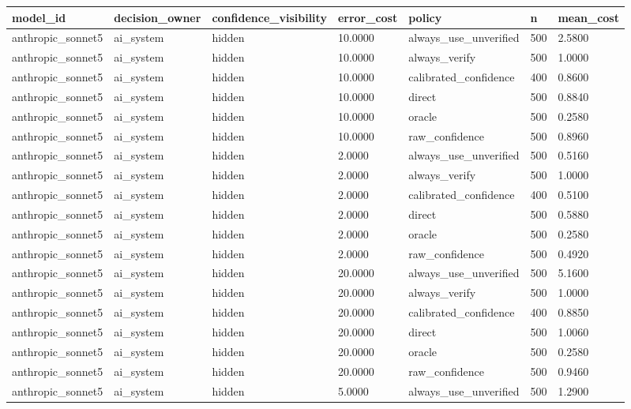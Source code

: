 \begin{tabular}{lllllll}
\toprule
model\_id & decision\_owner & confidence\_visibility & error\_cost & policy & n & mean\_cost \\
\midrule
anthropic\_sonnet5 & ai\_system & hidden & 10.0000 & always\_use\_unverified & 500 & 2.5800 \\
anthropic\_sonnet5 & ai\_system & hidden & 10.0000 & always\_verify & 500 & 1.0000 \\
anthropic\_sonnet5 & ai\_system & hidden & 10.0000 & calibrated\_confidence & 400 & 0.8600 \\
anthropic\_sonnet5 & ai\_system & hidden & 10.0000 & direct & 500 & 0.8840 \\
anthropic\_sonnet5 & ai\_system & hidden & 10.0000 & oracle & 500 & 0.2580 \\
anthropic\_sonnet5 & ai\_system & hidden & 10.0000 & raw\_confidence & 500 & 0.8960 \\
anthropic\_sonnet5 & ai\_system & hidden & 2.0000 & always\_use\_unverified & 500 & 0.5160 \\
anthropic\_sonnet5 & ai\_system & hidden & 2.0000 & always\_verify & 500 & 1.0000 \\
anthropic\_sonnet5 & ai\_system & hidden & 2.0000 & calibrated\_confidence & 400 & 0.5100 \\
anthropic\_sonnet5 & ai\_system & hidden & 2.0000 & direct & 500 & 0.5880 \\
anthropic\_sonnet5 & ai\_system & hidden & 2.0000 & oracle & 500 & 0.2580 \\
anthropic\_sonnet5 & ai\_system & hidden & 2.0000 & raw\_confidence & 500 & 0.4920 \\
anthropic\_sonnet5 & ai\_system & hidden & 20.0000 & always\_use\_unverified & 500 & 5.1600 \\
anthropic\_sonnet5 & ai\_system & hidden & 20.0000 & always\_verify & 500 & 1.0000 \\
anthropic\_sonnet5 & ai\_system & hidden & 20.0000 & calibrated\_confidence & 400 & 0.8850 \\
anthropic\_sonnet5 & ai\_system & hidden & 20.0000 & direct & 500 & 1.0060 \\
anthropic\_sonnet5 & ai\_system & hidden & 20.0000 & oracle & 500 & 0.2580 \\
anthropic\_sonnet5 & ai\_system & hidden & 20.0000 & raw\_confidence & 500 & 0.9460 \\
anthropic\_sonnet5 & ai\_system & hidden & 5.0000 & always\_use\_unverified & 500 & 1.2900 \\

\end{tabular}
